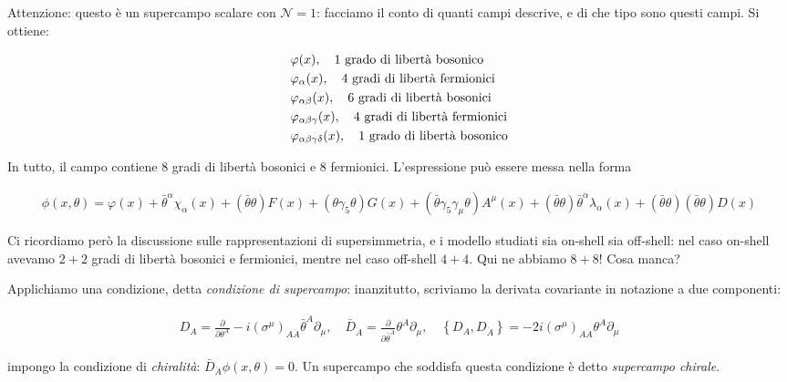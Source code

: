 \documentclass{report}
\begin{document}
Attenzione: questo è un supercampo scalare con \(\mathcal{N} =1\): facciamo il conto di quanti campi descrive, e di che tipo sono questi campi. Si ottiene: 

\begin{align}
    &\varphi(x), \quad \text{1 grado di libertà bosonico} \notag \\
    &\varphi_\alpha(x), \quad \text{4 gradi di libertà fermionici} \notag \\
    &\varphi_{\alpha\beta}(x), \quad \text{6 gradi di libertà bosonici} \notag \\
    &\varphi_{\alpha\beta\gamma}(x), \quad \text{4 gradi di libertà fermionici} \notag \\
    &\varphi_{\alpha\beta\gamma\delta}(x), \quad \text{1 grado di libertà bosonico} \notag \\
\end{align}

In tutto, il campo contiene 8 gradi di libertà bosonici e 8 fermionici. L'espressione può essere messa nella forma 

\begin{align}
    \phi(x, \theta) = \varphi(x) + \bar{\theta}^\alpha \chi_\alpha(x) + (\bar{\theta}\theta)F(x) + (\theta\gamma_5 \theta)G(x) + (\bar{\theta}\gamma_5\gamma_\mu \theta)A^\mu(x) + (\bar{\theta}\theta)\bar{\theta}^\alpha \lambda_\alpha (x) + (\bar{\theta}\theta)(\bar{\theta}\theta)D(x) 
\end{align}
    
Ci ricordiamo però la discussione sulle rappresentazioni di supersimmetria, e i modello studiati sia on-shell sia off-shell: nel caso on-shell avevamo \(2+2\) gradi di libertà bosonici e fermionici, mentre nel caso off-shell \(4+4\). Qui ne abbiamo \(8+8\)! Cosa manca? 

Applichiamo una condizione, detta \emph{condizione di supercampo}: inanzitutto, scriviamo la derivata covariante in notazione a due componenti: 

\begin{align}
    D_A = \frac{\partial}{\partial \theta^A} - i(\sigma^\mu)_{A\dot{A}}\bar{\theta}^{\dot{A}}\partial_\mu, \quad \bar{D}_{\dot{A}} = \frac{\partial}{\partial \bar{\theta}^{\dot{A}}} \theta^A \partial_\mu, \quad \left\{ D_A, D_{\dot{A}} \right\} = -2i (\sigma^\mu)_{A\dot{A}}\theta^A \partial_\mu
\end{align}

impongo la condizione di \emph{chiralità}: \(\bar{D}_{\dot{A}}\phi(x, \theta) = 0\). Un supercampo che soddisfa questa condizione è detto \emph{supercampo chirale}. 
\end{document}

